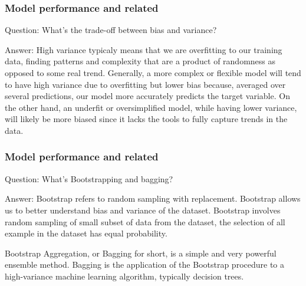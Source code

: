 \documentclass[11pt]{beamer}
\begin{document}
\begin{frame}
\frametitle{Model performance and related}
\begin{block}{Question:}
	What’s the trade-off between bias and variance?
\end{block}
\begin{block}{Answer:}
	High variance typicaly means that we are overfitting to our training data, finding patterns and complexity that are a product of randomness as opposed to some real trend. Generally, a more complex or flexible model will tend to have high variance due to overfitting but lower bias because, averaged over several predictions, our model more accurately predicts the target variable. On the other hand, an underfit or oversimplified model, while having lower variance, will likely be more biased since it lacks the tools to fully capture trends in the data.
\end{block}
\end{frame}

\begin{frame}
\frametitle{Model performance and related}
\begin{block}{Question:}
	What’s Bootstrapping and bagging?
\end{block}
\begin{block}{Answer:}
	Bootstrap refers to random sampling with replacement. Bootstrap allows us to better understand bias and variance of the dataset. Bootstrap involves random sampling of small subset of data from the dataset, the selection of all example in the dataset has equal probability. 
	
	Bootstrap Aggregation, or Bagging for short, is a simple and very powerful ensemble method. Bagging is the application of the Bootstrap procedure to a high-variance machine learning algorithm, typically decision trees.
\end{block}
\end{frame}
\end{document}
